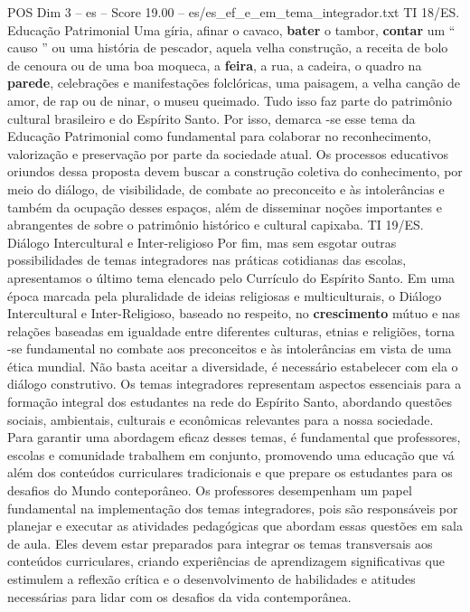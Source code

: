 \begin{textsample}{POS Dim 3 – es – Score 19.00 – es/es\_ef\_e\_em\_tema\_integrador.txt}
TI 18/ES.
Educação Patrimonial Uma gíria, afinar o cavaco, \textbf{bater} o tambor, \textbf{contar} um “ causo ” ou uma história de pescador, aquela velha construção, a receita de bolo de cenoura ou de uma boa moqueca, a \textbf{feira}, a rua, a cadeira, o quadro na \textbf{parede}, celebrações e manifestações folclóricas, uma paisagem, a velha canção de amor, de rap ou de ninar, o museu queimado.
Tudo isso faz parte do patrimônio cultural brasileiro e do Espírito Santo.
Por isso, demarca -se esse tema da Educação Patrimonial como fundamental para colaborar no reconhecimento, valorização e preservação por parte da sociedade atual.
Os processos educativos oriundos dessa proposta devem buscar a construção coletiva do conhecimento, por meio do diálogo, de visibilidade, de combate ao preconceito e às intolerâncias e também da ocupação desses espaços, além de disseminar noções importantes e abrangentes de sobre o patrimônio histórico e cultural capixaba.
TI 19/ES.
Diálogo Intercultural e Inter-religioso Por fim, mas sem esgotar outras possibilidades de temas integradores nas práticas cotidianas das escolas, apresentamos o último tema elencado pelo Currículo do Espírito Santo.
Em uma época marcada pela pluralidade de ideias religiosas e multiculturais, o Diálogo Intercultural e Inter-Religioso, baseado no respeito, no \textbf{crescimento} mútuo e nas relações baseadas em igualdade entre diferentes culturas, etnias e religiões, torna -se fundamental no combate aos preconceitos e às intolerâncias em vista de uma ética mundial.
Não basta aceitar a diversidade, é necessário estabelecer com ela o diálogo construtivo.
Os temas integradores representam aspectos essenciais para a formação integral dos estudantes na rede do Espírito Santo, abordando questões sociais, ambientais, culturais e econômicas relevantes para a nossa sociedade.
Para garantir uma abordagem eficaz desses temas, é fundamental que professores, escolas e comunidade trabalhem em conjunto, promovendo uma educação que vá além dos conteúdos curriculares tradicionais e que prepare os estudantes para os desafios do Mundo conteporâneo.
Os professores desempenham um papel fundamental na implementação dos temas integradores, pois são responsáveis por planejar e executar as atividades pedagógicas que abordam essas questões em sala de aula.
Eles devem estar preparados para integrar os temas transversais aos conteúdos curriculares, criando experiências de aprendizagem significativas que estimulem a reflexão crítica e o desenvolvimento de habilidades e atitudes necessárias para lidar com os desafios da vida contemporânea.

\end{textsample}
